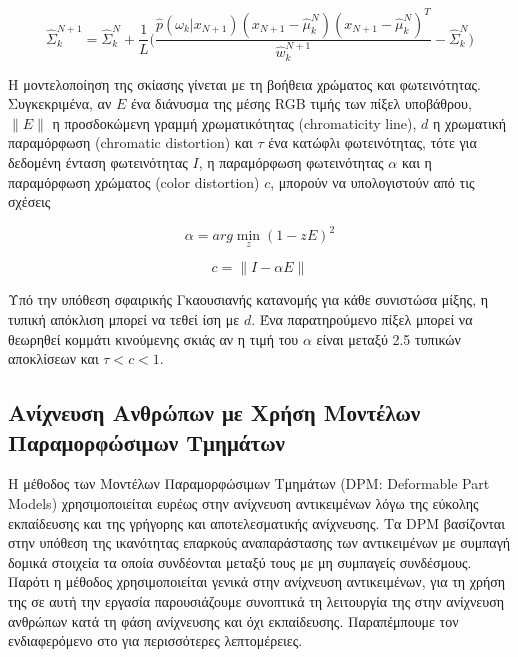 \documentclass[11pt,a4paper,english,greek,twoside]{../Thesis}
\begin{document}
\begin{equation}\label{eq:cov2}
    \hat{\Sigma}_{k}^{N+1}=\hat{\Sigma}_{k}^{N}+\frac{1}{L} \big( \frac{\hat{p}(\omega_{k}|x_{N+1})(x_{N+1}-\hat{\mu}_{k}^{N})(x_{N+1}-\hat{\mu}_{k}^{N})^{T}}{\hat{w}_{k}^{N+1}}-\hat{\Sigma}_{k}^{N} \big)
\end{equation}

\par Η μοντελοποίηση της σκίασης γίνεται με τη βοήθεια χρώματος και φωτεινότητας. Συγκεκριμένα, αν $E$ ένα διάνυσμα της μέσης RGB τιμής των πίξελ υποβάθρου, $\| E \|$ η προσδοκώμενη γραμμή χρωματικότητας (chromaticity line), $d$ η χρωματική παραμόρφωση (chromatic distortion) και $\tau$ ένα κατώφλι φωτεινότητας, τότε για δεδομένη ένταση φωτεινότητας $I$, η παραμόρφωση φωτεινότητας $\alpha$ και η παραμόρφωση χρώματος (color distortion) $c$, μπορούν να υπολογιστούν από τις σχέσεις

\begin{equation}\label{eq:gmmdist1}
    \alpha=arg\min_{z}(1-zE)^{2}
\end{equation}

\begin{equation}\label{eq:gmmdist2}
    c=\| I-\alpha E\|
\end{equation}

Υπό την υπόθεση σφαιρικής Γκαουσιανής κατανομής για κάθε συνιστώσα μίξης, η τυπική απόκλιση μπορεί να τεθεί ίση με $d$. Ένα παρατηρούμενο πίξελ μπορεί να θεωρηθεί κομμάτι κινούμενης σκιάς αν η τιμή του $\alpha$ είναι μεταξύ 2.5 τυπικών αποκλίσεων και $\tau <c<1$.


\subsection{Ανίχνευση Ανθρώπων με Χρήση Μοντέλων Παραμορφώσιμων Τμημάτων}
Η μέθοδος των Μοντέλων Παραμορφώσιμων Τμημάτων (DPM: Deformable Part Models) χρησιμοποιείται ευρέως στην ανίχνευση αντικειμένων λόγω της εύκολης εκπαίδευσης και της γρήγορης και αποτελεσματικής ανίχνευσης. Τα DPM βασίζονται στην υπόθεση της ικανότητας επαρκούς αναπαράστασης των αντικειμένων με συμπαγή δομικά στοιχεία τα οποία συνδέονται μεταξύ τους με μη συμπαγείς συνδέσμους. Παρότι η μέθοδος χρησιμοποιείται γενικά στην ανίχνευση αντικειμένων, για τη χρήση της σε αυτή την εργασία παρουσιάζουμε συνοπτικά τη λειτουργία της στην ανίχνευση ανθρώπων κατά τη φάση ανίχνευσης και όχι εκπαίδευσης. Παραπέμπουμε τον ενδιαφερόμενο στο \cite{felzenszwalb_2010} για περισσότερες λεπτομέρειες.
\end{document}
